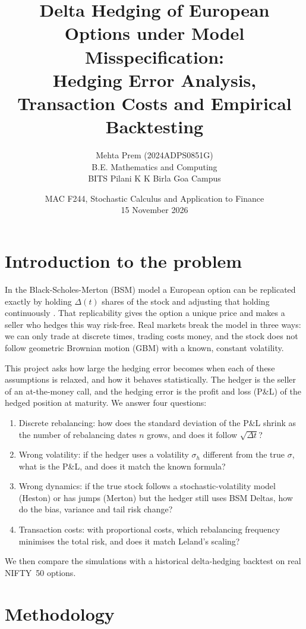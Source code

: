 \documentclass[11pt,a4paper]{article}
\title{Delta Hedging of European Options under Model Misspecification:\\
Hedging Error Analysis, Transaction Costs and Empirical Backtesting}
\author{Mehta Prem (2024ADPS0851G)\\
B.E. Mathematics and Computing\\
BITS Pilani K K Birla Goa Campus}
\date{MAC F244, Stochastic Calculus and Application to Finance\\
15 November 2026}
\renewcommand{\normalsize}{\fontsize{10.5pt}{12.6pt}\selectfont}
\begin{document}
\normalsize
\maketitle
\vspace{-2em}

\section{Introduction to the problem}

In the Black-Scholes-Merton (BSM) model a European option can be replicated exactly by holding $\Delta(t)$ shares of the stock and adjusting that holding continuously \cite{bs73,merton73,hull}. That replicability gives the option a unique price and makes a seller who hedges this way risk-free. Real markets break the model in three ways: we can only trade at discrete times, trading costs money, and the stock does not follow geometric Brownian motion (GBM) with a known, constant volatility.

This project asks how large the hedging error becomes when each of these assumptions is relaxed, and how it behaves statistically. The hedger is the seller of an at-the-money call, and the hedging error is the profit and loss (P\&L) of the hedged position at maturity. We answer four questions:
\begin{enumerate}
  \item Discrete rebalancing: how does the standard deviation of the P\&L shrink as the number of rebalancing dates $n$ grows, and does it follow $\sqrt{\Delta t}$?
  \item Wrong volatility: if the hedger uses a volatility $\sigma_h$ different from the true $\sigma$, what is the P\&L, and does it match the known formula?
  \item Wrong dynamics: if the true stock follows a stochastic-volatility model (Heston) or has jumps (Merton) but the hedger still uses BSM Deltas, how do the bias, variance and tail risk change?
  \item Transaction costs: with proportional costs, which rebalancing frequency minimises the total risk, and does it match Leland's scaling?
\end{enumerate}
We then compare the simulations with a historical delta-hedging backtest on real NIFTY~50 options.

\section{Methodology}
\end{document}
